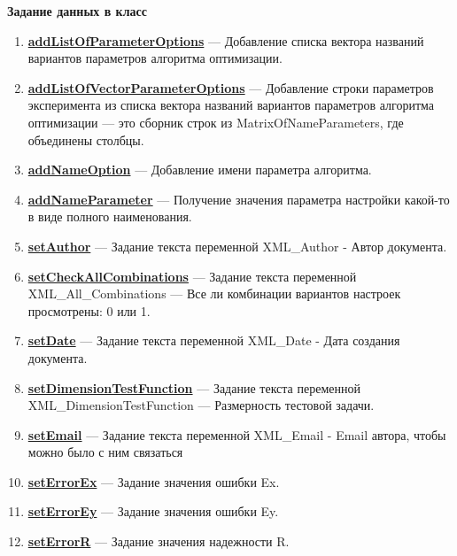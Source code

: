 \documentclass[a4paper,12pt]{article}
\begin{document}
\textbf{Задание данных в класс}
\begin{enumerate}

\item \textbf{\hyperref[addListOfParameterOptions]{addListOfParameterOptions}} --- Добавление списка вектора названий вариантов параметров алгоритма оптимизации.

\item \textbf{\hyperref[addListOfVectorParameterOptions]{addListOfVectorParameterOptions}} --- Добавление строки параметров эксперимента из списка вектора названий вариантов параметров алгоритма оптимизации --- это сборник строк из MatrixOfNameParameters, где объединены столбцы.

\item \textbf{\hyperref[addNameOption]{addNameOption}} --- Добавление имени параметра алгоритма.

\item \textbf{\hyperref[addNameParameter]{addNameParameter}} --- Получение значения параметра настройки какой-то в виде полного наименования.

\item \textbf{\hyperref[setAuthor]{setAuthor}} --- Задание текста переменной XML\_Author - Автор документа.

\item \textbf{\hyperref[setCheckAllCombinations]{setCheckAllCombinations}} --- Задание текста переменной  XML\_All\_Combinations --- Все ли комбинации вариантов настроек просмотрены: 0 или 1.

\item \textbf{\hyperref[setDate]{setDate}} --- Задание текста переменной  XML\_Date - Дата создания документа.

\item \textbf{\hyperref[setDimensionTestFunction]{setDimensionTestFunction}} --- Задание текста переменной  XML\_DimensionTestFunction --- Размерность тестовой задачи.

\item \textbf{\hyperref[setEmail]{setEmail}} --- Задание текста переменной  XML\_Email - Email автора, чтобы можно было с ним связаться

\item \textbf{\hyperref[setErrorEx]{setErrorEx}} --- Задание значения ошибки Ex.

\item \textbf{\hyperref[setErrorEy]{setErrorEy}} --- Задание значения ошибки Ey.

\item \textbf{\hyperref[setErrorR]{setErrorR}} --- Задание значения надежности R.


\end{enumerate}
\end{document}
